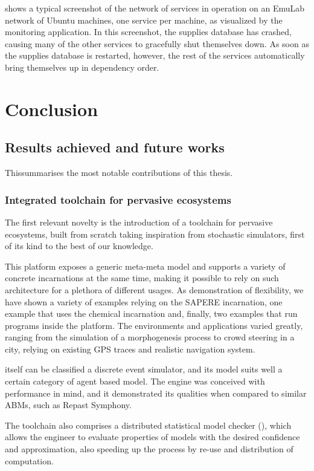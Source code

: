 \documentclass[12pt,a4paper,twoside,openright]{book}
\begin{document}
 shows a typical screenshot of the network of services in operation on an EmuLab network of Ubuntu machines, one service per machine, as visualized by the monitoring application.
%
In this screenshot, the supplies database has crashed, causing many of the other services to gracefully shut themselves down.  As soon as the supplies database is restarted, however, the rest of the services automatically bring themselves up in dependency order.

\part{Conclusion}
\chapter{Results achieved and future works}

This\levelText{}summarises the most notable contributions of this thesis.

\section{Integrated toolchain for pervasive ecosystems}

The first relevant novelty is the introduction of a toolchain for pervasive ecosystems, built from scratch taking inspiration from stochastic simulators, first of its kind to the best of our knowledge.

This platform exposes a generic meta-meta model and supports a variety of concrete incarnations at the same time, making it possible to rely on such architecture for a plethora of different usages.
%
As demonstration of flexibility, we have shown a variety of examples relying on the SAPERE incarnation, one example that uses the chemical incarnation and, finally, two examples that run \protelis{} programs inside the platform.
%
The environments and applications varied greatly, ranging from the simulation of a morphogenesis process to crowd steering in a city, relying on existing GPS traces and realistic navigation system.

\alchemist{} itself can be classified a discrete event simulator, and its model suits well a certain category of agent based model.
%
The engine was conceived with performance in mind, and it demonstrated its qualities when compared to similar ABMs, such as Repast Symphony.

The toolchain also comprises a distributed statistical model checker (\multivesta{}), which allows the engineer to evaluate properties of models with the desired confidence and approximation, also speeding up the process by re-use and distribution of computation.
\end{document}
